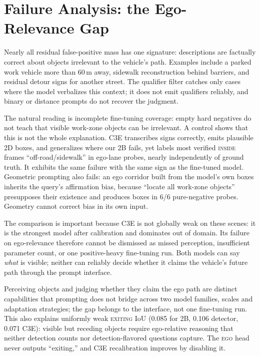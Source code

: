 \documentclass[10pt,twocolumn,letterpaper]{article}
\begin{document}
\section{Failure Analysis: the Ego-Relevance Gap}
\label{sec:analysis}

Nearly all residual false-positive mass has one signature: descriptions are factually correct about objects irrelevant to the vehicle's path.  Examples include a parked work vehicle more than 60\,m away, sidewalk reconstruction behind barriers, and residual detour signs for another street.  The qualifier filter catches only cases where the model verbalizes this context; it does not emit qualifiers reliably, and binary or distance prompts do not recover the judgment.

The natural reading is incomplete fine-tuning coverage: empty hard negatives do not teach that visible work-zone objects can be irrelevant.  A control shows that this is not the whole explanation.  C3E transcribes signs correctly, emits plausible 2D boxes, and generalizes where our 2B fails, yet labels most verified \textsc{inside} frames ``off-road/sidewalk'' in ego-lane probes, nearly independently of ground truth.  It exhibits the same failure with the same sign as the fine-tuned model.  Geometric prompting also fails: an ego corridor built from the model's own boxes inherits the query's affirmation bias, because ``locate all work-zone objects'' presupposes their existence and produces boxes in 6/6 pure-negative probes.  Geometry cannot correct bias in its own input.

The comparison is important because C3E is not globally weak on these scenes: it is the strongest model after calibration and dominates out of domain.  Its failure on ego-relevance therefore cannot be dismissed as missed perception, insufficient parameter count, or one positive-heavy fine-tuning run.  Both models can say \emph{what} is visible; neither can reliably decide whether it claims the vehicle's future path through the prompt interface.

Perceiving objects and judging whether they claim the ego path are distinct capabilities that prompting does not bridge across two model families, scales and adaptation strategies; the gap belongs to the interface, not one fine-tuning run.  This also explains uniformly weak \textsc{exiting} IoU (0.085 for 2B, 0.106 detector, 0.071 C3E): visible but receding objects require ego-relative reasoning that neither detection counts nor detection-flavored questions capture.  The \textsc{ego} head never outputs ``exiting,'' and C3E recalibration improves by disabling it.
\end{document}

